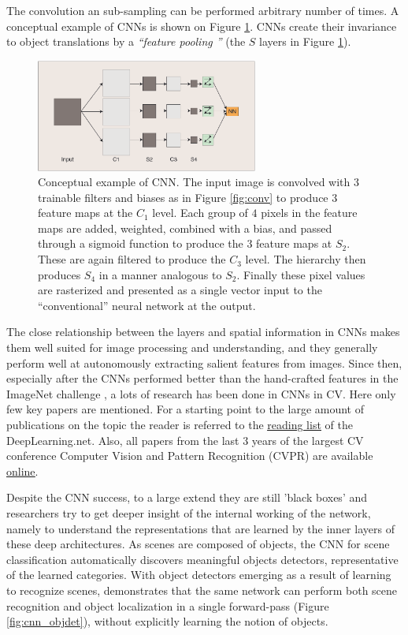 The convolution an sub-sampling can be performed arbitrary number of times. A conceptual example of CNNs is shown on Figure \ref{fig:cnn}. CNNs create their invariance to object translations by a {\em ``feature pooling ''} (the $S$ layers in Figure \ref{fig:cnn}). 

\begin{figure}[H]
\begin{center}
\includegraphics[width=0.65\textwidth]{fig/cnn}
\end{center}
\caption{Conceptual example of CNN. The input image is convolved with $3$ trainable filters and biases as in Figure \ref{fig:conv} to produce $3$ feature maps at the $C_1$
level. Each group of $4$ pixels in the feature maps are added, weighted, combined with a bias, and passed through a sigmoid function to produce the $3$ feature maps at $S_2$. These are again
filtered to produce the $C_3$ level. The hierarchy then produces $S_4$ in a manner analogous to $S_2$. Finally these pixel values are rasterized and presented as a single vector input to the “conventional” neural network at the output.}
\label{fig:cnn}
\end{figure}

The close relationship between the layers and spatial information in CNNs makes them well suited for image processing and understanding, and they generally perform well at autonomously extracting salient features from images. Since then, especially after the CNNs performed better than the hand-crafted features in the ImageNet challenge \cite{ILSVRC15}, a lots of research has been done in CNNs in CV. 
Here only few key papers are mentioned. For a starting point to the large amount of publications on the topic the reader is referred to the \href{http://deeplearning.net/reading-list/}{\underline{reading list}} of the DeepLearning.net. Also, all papers from the last $3$ years of the largest CV conference Computer Vision and Pattern Recognition (CVPR)  are available \href{http://www.cv-foundation.org/openaccess/menu.py}{\underline{online}}.

Despite the CNN success, to a large extend they are still 'black boxes' and researchers try to get deeper insight of the internal working of the network, namely to understand
the representations that are learned by the inner layers of these deep architectures. As scenes are composed of objects, the CNN for scene classification
automatically discovers meaningful objects detectors, representative of the learned categories. With object detectors emerging as a result of learning to
recognize scenes,\cite{ZhouKLOT14} demonstrates that the same network can perform both scene recognition and object localization in a single forward-pass (Figure \ref{fig:cnn_objdet}), without
 explicitly learning the notion of objects. 

